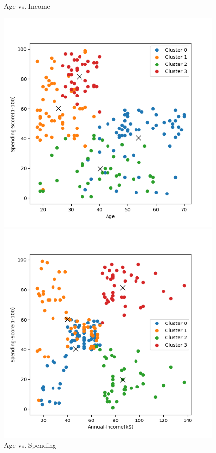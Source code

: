 \documentclass[8pt]{article}
\begin{document}
\begin{figure}[H]
\begin{minipage}{0.32\textwidth}
        \caption{Age vs. Income}
        \label{fig: Age vs. Annual Income k4 com con min20}
    \end{minipage}
    \hfill
    \begin{minipage}{0.32\textwidth}
        \centering
        \includegraphics[width=\textwidth]{./Prob4/out/task3_2_com/images/cluster_result_k4_0_2.png}
        \caption{Age vs. Spending}
        \label{fig: Age vs. Spending Score k4 com con min20}
    \end{minipage}
    \hfill
    \begin{minipage}{0.32\textwidth}
        \centering
        \includegraphics[width=\textwidth]{./Prob4/out/task3_2_com/images/cluster_result_k4_1_2.png}

\end{minipage}
\end{figure}
\end{document}
